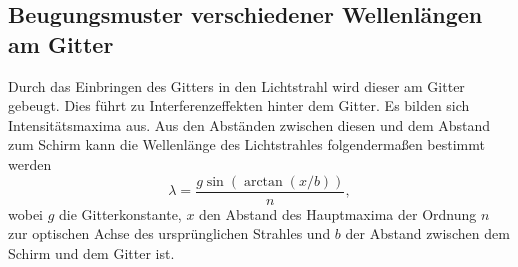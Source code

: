 \subsection{Beugungsmuster verschiedener Wellenlängen am Gitter}
Durch das Einbringen des Gitters in den Lichtstrahl wird dieser am Gitter gebeugt. Dies führt zu Interferenzeffekten hinter dem Gitter. Es bilden sich Intensitätsmaxima aus. Aus den Abständen zwischen diesen und dem Abstand zum Schirm kann die Wellenlänge des Lichtstrahles folgendermaßen bestimmt werden
\begin{equation}
	\lambda = \frac{g \sin(\arctan(x/b))}{n}, \label{eq:lambda}
\end{equation}
wobei $g$ die Gitterkonstante, $x$ den Abstand des Hauptmaxima der Ordnung $n$ zur optischen Achse des ursprünglichen Strahles und $b$ der Abstand zwischen dem Schirm und dem Gitter ist.


